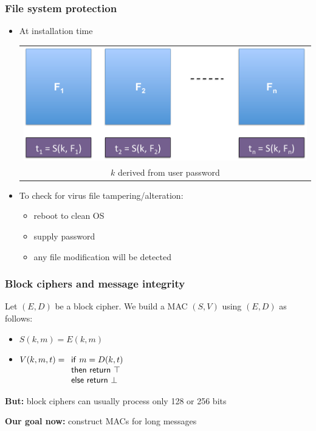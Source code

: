 \documentclass[aspectratio=169, lualatex, handout, 10pt,dvipsnames,svgnames]{beamer} %
\begin{document}
\begin{frame}

  \frametitle{File system protection}
\vspace{-0.5cm}
  \begin{itemize}
  \item At installation time
    \begin{center}
      \begin{tabular}{c}
        \includegraphics[scale=0.4]{Images/fileProtection.pdf} \\
        $k$ derived from user password
      \end{tabular}
    \end{center}
    \medskip{}
  \item To check for virus file tampering/alteration:
    \begin{itemize}
    \item reboot to clean OS
    \item supply password
    \item any file modification will be detected
    \end{itemize}
  \end{itemize}

\end{frame}

\begin{frame}
  \frametitle{Block ciphers and message integrity}
  \pause

  Let $(E, D)$ be a block cipher. We build a MAC $(S, V)$ using $(E, D)$ as follows:
  \begin{itemize}
  \item $S(k, m) = E(k, m)$
  \item $V(k, m, t) =
    \begin{array}[t]{l}
      \mathsf{if}\ m = D(k, t) \\
      \mathsf{then\ return}\ \top \\
      \mathsf{else\ return}\ \bot
    \end{array}
    $
  \end{itemize}
  \bigskip{}
  \pause

  {\bf But:} block ciphers can usually process only 128 or 256 bits
  \bigskip{}
  \pause

  {\bf Our goal now:} construct MACs for long messages

\end{frame}
\end{document}
